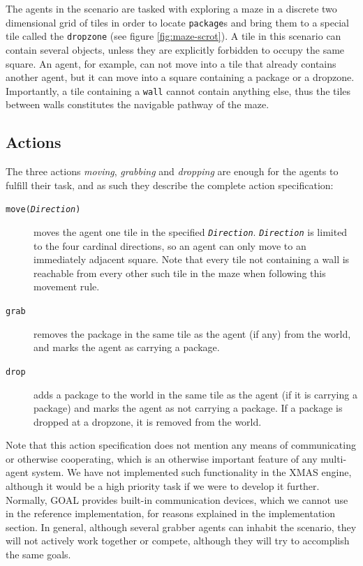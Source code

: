 The agents in the scenario are tasked with exploring a maze in a discrete
two dimensional grid of tiles in order to locate \texttt{package}s
and bring them to a special tile called the \texttt{dropzone} (see
figure \ref{fig:maze-scrot}). A tile in this scenario can contain
several objects, unless they are explicitly forbidden to occupy the
same square. An agent, for example, can not move into a tile that
already contains another agent, but it can move into a square containing
a package or a dropzone. Importantly, a tile containing a \texttt{wall}
cannot contain anything else, thus the tiles between walls constitutes
the navigable pathway of the maze. 


\subsection*{Actions}

The three actions \emph{moving}, \emph{grabbing} and \emph{dropping}
are enough for the agents to fulfill their task, and as such they
describe the complete action specification:
\begin{description}
\item [{\texttt{move(}\texttt{\emph{Direction}}\texttt{)}}] moves the agent
one tile in the specified \texttt{\emph{Direction}}. \texttt{\emph{Direction}}\emph{
}is limited to the four cardinal directions, so an agent can only
move to an immediately adjacent square. Note that every tile not containing
a wall is reachable from every other such tile in the maze when following
this movement rule.
\item [{\texttt{grab}}] removes the package in the same tile as the agent
(if any) from the world, and marks the agent as carrying a package.
\item [{\texttt{drop}}] adds a package to the world in the same tile as
the agent (if it is carrying a package) and marks the agent as not
carrying a package. If a package is dropped at a dropzone, it is removed
from the world.
\end{description}
Note that this action specification does not mention any means of
communicating or otherwise cooperating, which is an otherwise important
feature of any multi-agent system. We have not implemented such functionality
in the XMAS engine, although it would be a high priority task if we
were to develop it further. Normally, GOAL provides built-in communication
devices, which we cannot use in the reference implementation, for
reasons explained in the implementation section. In general, although
several grabber agents can inhabit the scenario, they will not actively
work together or compete, although they will try to accomplish the
same goals.


